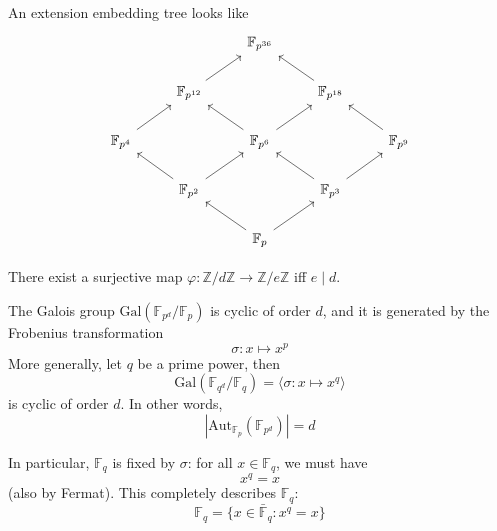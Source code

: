 \documentclass[openany]{book}
\newcommand{\Z}{\mathbb{Z}}
\newcommand{\F}{\mathbb{F}}
\newcommand{\la}{\langle}
\newcommand{\ra}{\rangle}
\newcommand{\gal}{\text{Gal}}
\newcommand{\aut}{\text{Aut}}
\begin{document}
\begin{example}
    An extension embedding tree looks like 
    \[\begin{tikzcd}
        && {\mathbb{F}_{p^{36}}} \\
        & {\mathbb{F}_{p^{12}}} && {\mathbb{F}_{p^{18}}} \\
        {\mathbb{F}_{p^4}} && {\mathbb{F}_{p^6}} && {\mathbb{F}_{p^9}} \\
        & {\mathbb{F}_{p^2}} && {\mathbb{F}_{p^3}} \\
        && {\mathbb{F}_p}
        \arrow[from=2-2, to=1-3]
        \arrow[from=2-4, to=1-3]
        \arrow[from=3-1, to=2-2]
        \arrow[from=3-3, to=2-2]
        \arrow[from=3-3, to=2-4]
        \arrow[from=3-5, to=2-4]
        \arrow[from=4-2, to=3-1]
        \arrow[from=4-2, to=3-3]
        \arrow[from=4-4, to=3-3]
        \arrow[from=4-4, to=3-5]
        \arrow[from=5-3, to=4-2]
        \arrow[from=5-3, to=4-4]
    \end{tikzcd}\]
\end{example}

\begin{prop}
    There exist a surjective map $\varphi: \Z/d\Z\to\Z/e\Z$ iff $e \mid d$.
\end{prop}

\begin{prop}
    The Galois group $\gal(\F_{p^d}/\F_p)$ is cyclic of order $d$, and it is generated by the Frobenius transformation 
    \begin{equation*}
        \sigma: x\mapsto x^p
    \end{equation*}
    More generally, let $q$ be a prime power, then 
    \begin{equation*}
        \gal(\F_{q^d}/\F_q)=\la \sigma: x\mapsto x^q\ra
    \end{equation*}
    is cyclic of order $d$. In other words, 
    \begin{equation*}
        |\aut_{\F_p}(\F_{p^d})|=d
    \end{equation*}
\end{prop}
In particular, $\F_q$ is fixed by $\sigma$: for all $x\in\F_q$, we must have 
\begin{equation*}
    x^q=x
\end{equation*}
(also by Fermat). This completely describes $\F_q$:
\begin{equation*}
    \F_q=\{x\in\bar{\F}_q: x^q=x\}
\end{equation*}
\end{document}

